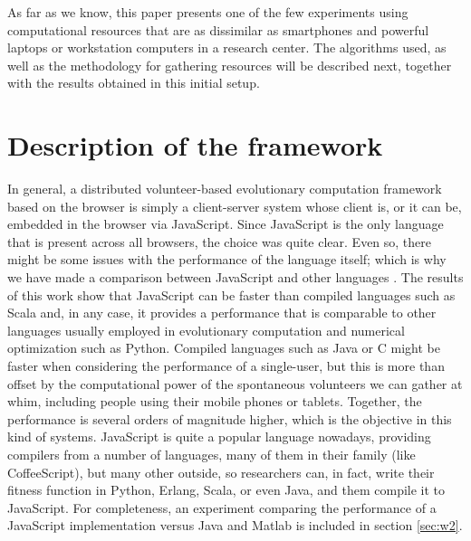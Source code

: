 \documentclass[journal,onecolumn]{IEEEtran}
\begin{document}
As far as we know, this paper presents one of the few experiments using %
computational resources that are as dissimilar as smartphones and
powerful laptops 
or workstation computers in a research center. 
The algorithms used, as well as the methodology 
for gathering resources will be described next, 
together with the results obtained in this initial setup.
\section{Description of the framework}
\label{sec:description}

In general, a distributed volunteer-based evolutionary computation
framework based on the browser is simply a client-server system
whose client is, or it can be, embedded in the browser via
JavaScript. Since JavaScript is  the only language that is present
across all browsers, the choice was quite clear. Even so, there might
be some issues with the performance of the language itself; which %
 is
why we have made a comparison between JavaScript and other languages
\cite{2015arXiv151101088M}. The results of this work show that JavaScript can be
faster than compiled languages such as Scala and, in any case, it provides
a performance that is comparable to other languages usually employed %
in evolutionary computation and numerical optimization such as Python. 
Compiled languages such as
Java or C might be faster when %
considering the performance of a single-user, 
but this is more than offset by the computational power of
the spontaneous volunteers we can gather at whim, including people
using their mobile phones or tablets. Together, the performance is several orders of magnitude
higher, which is the objective in this kind of systems.
 JavaScript is
quite a popular language nowadays, providing compilers from a number
of languages, many of them in their family (like CoffeeScript), but
many other outside, so researchers can, in fact, write their fitness
function in Python, Erlang, Scala, or even Java, and them compile it to
JavaScript. For completeness, an experiment comparing the performance of
a JavaScript implementation versus Java and Matlab is included in section
\ref{sec:w2}.
\end{document}
